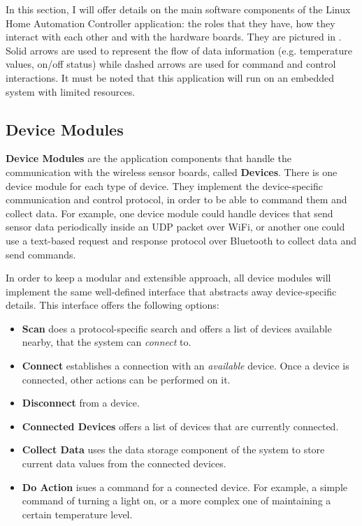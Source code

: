 In this section, I will offer details on the main software components of the Linux Home Automation Controller application: the roles that they have, how they interact with each other and with the hardware boards. They are pictured in . Solid arrows are used to represent the flow of data information (e.g. temperature values, on/off status) while dashed arrows are used for command and control interactions. It must be noted that this application will run on an embedded system with limited resources.


\subsection{Device Modules}
\label{sub-sec:device-modules-design}

\textbf{Device Modules} are the application components that handle the communication with the wireless sensor boards, called \textbf{Devices}. There is one device module for each type of device. They implement the device-specific communication and control protocol, in order to be able to command them and collect data. For example, one device module could handle devices that send sensor data periodically inside an UDP packet over WiFi, or another one could use a text-based request and response protocol over Bluetooth to collect data and send commands.

In order to keep a modular and extensible approach, all device modules will implement the same well-defined interface that abstracts away device-specific details. This interface offers the following options:

\begin{itemize}

  \item \textbf{Scan} does a protocol-specific search and offers a list of devices available nearby, that the system can \textit{connect} to.

  \item \textbf{Connect} establishes a connection with an \textit{available} device. Once a device is connected, other actions can be performed on it.

  \item \textbf{Disconnect} from a device.

  \item \textbf{Connected Devices} offers a list of devices that are currently connected.

  \item \textbf{Collect Data} uses the data storage component of the system to store current data values from the connected devices.

  \item \textbf{Do Action} isues a command for a connected device. For example, a simple command of turning a light on, or a more complex one of maintaining a certain temperature level.

\end{itemize}

